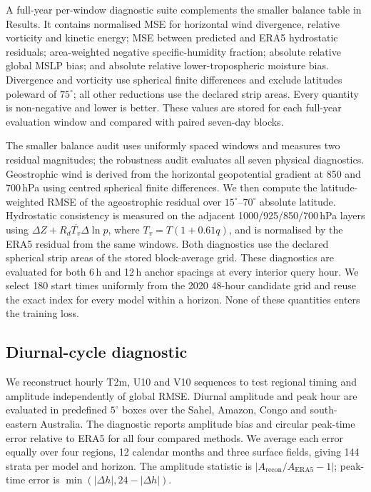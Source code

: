 \documentclass[referee,lineno,pdflatex,sn-nature]{sn-jnl}
\begin{document}
A full-year per-window diagnostic suite complements the smaller balance table
in Results. It contains normalised
MSE for horizontal wind divergence, relative vorticity and kinetic energy;
MSE between predicted and ERA5 hydrostatic residuals; area-weighted negative
specific-humidity fraction; absolute relative global MSLP bias; and absolute
relative lower-tropospheric moisture bias. Divergence and vorticity use
spherical finite differences and exclude latitudes poleward of
$75^\circ$; all other reductions use the declared strip areas. Every
quantity is non-negative and lower is better. These values are stored for
each full-year evaluation window and compared with paired seven-day blocks.

The smaller balance audit uses uniformly spaced windows and measures two
residual magnitudes; the robustness audit evaluates all seven physical
diagnostics. Geostrophic wind is derived from the horizontal
geopotential gradient at 850 and 700\,hPa using centred spherical finite
differences. We then compute the latitude-weighted RMSE
of the ageostrophic residual over $15^\circ$--$70^\circ$ absolute
latitude. Hydrostatic consistency is measured on the adjacent
1000/925/850/700\,hPa layers using
$\Delta Z+R_d\overline{T_v}\Delta\ln p$, where
$T_v=T(1+0.61q)$, and is normalised by the ERA5 residual from the same
windows. Both diagnostics use the declared spherical strip areas of the stored
block-average grid. These diagnostics are evaluated for both
6\,h and 12\,h anchor spacings at every interior query hour. We select 180
start times uniformly from the 2020 48-hour candidate grid and reuse the
exact index for every model within a horizon. None of these quantities enters
the training loss.

\subsection{Diurnal-cycle diagnostic}

We reconstruct hourly T2m, U10 and V10 sequences to test regional timing and
amplitude independently of global RMSE. Diurnal amplitude and peak hour are
evaluated in predefined
$5^\circ$ boxes over the Sahel, Amazon, Congo and south-eastern
Australia. The diagnostic reports amplitude bias and circular peak-time
error relative to ERA5 for all four compared methods. We average each
error equally over four regions, 12 calendar months and three surface
fields, giving 144 strata per model and horizon. The amplitude statistic
is $|A_{\mathrm{recon}}/A_{\mathrm{ERA5}}-1|$; peak-time error is
$\min(|\Delta h|,24-|\Delta h|)$.
\end{document}
